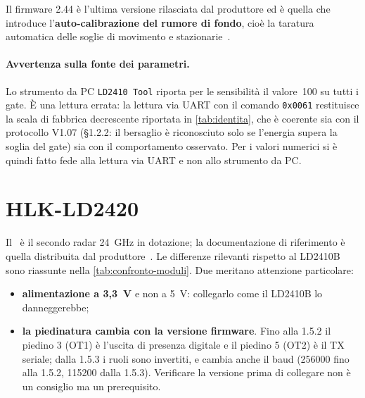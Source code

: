 Il firmware 2.44 è l'ultima versione rilasciata dal produttore ed è quella che
introduce l'\textbf{auto-calibrazione del rumore di fondo}, cioè la taratura
automatica delle soglie di movimento e stazionarie~\cite{hilinkV244}.

\paragraph{Avvertenza sulla fonte dei parametri.} Lo strumento da PC
\texttt{LD2410 Tool} riporta per le sensibilità il valore~100 su tutti i gate. È
una lettura errata: la lettura via UART con il comando \texttt{0x0061} restituisce
la scala di fabbrica decrescente riportata in \cref{tab:identita}, che è coerente
sia con il protocollo V1.07 (\S1.2.2: il bersaglio è riconosciuto solo se
l'energia supera la soglia del gate) sia con il comportamento osservato. Per i
valori numerici si è quindi fatto fede alla lettura via UART e non allo strumento
da PC.

\section{HLK-LD2420}
\label{sec:ld2420}

Il \ldc\ è il secondo radar 24~GHz in dotazione; la documentazione di
riferimento è quella distribuita dal produttore~\cite{hilinkDriveLD2420}. Le differenze rilevanti rispetto
al LD2410B sono riassunte nella \cref{tab:confronto-moduli}. Due meritano
attenzione particolare:

\begin{itemize}[leftmargin=1.4em,itemsep=2pt]
  \item \textbf{alimentazione a 3,3~V} e non a 5~V: collegarlo come il LD2410B lo
        danneggerebbe;
  \item \textbf{la piedinatura cambia con la versione firmware}. Fino alla 1.5.2 il
        piedino 3 (OT1) è l'uscita di presenza digitale e il piedino 5 (OT2) è il
        TX seriale; dalla 1.5.3 i ruoli sono invertiti, e cambia anche il baud
        (256000 fino alla 1.5.2, 115200 dalla 1.5.3). Verificare la versione prima
        di collegare non è un consiglio ma un prerequisito.
\end{itemize}

